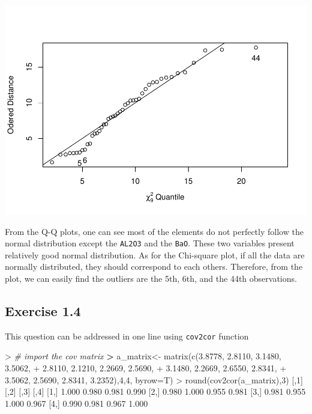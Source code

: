 \documentclass[
]{article}
\newenvironment{Shaded}{\begin{snugshade}}{\end{snugshade}}
\newcommand{\AttributeTok}[1]{\textcolor[rgb]{0.77,0.63,0.00}{#1}}
\newcommand{\CommentTok}[1]{\textcolor[rgb]{0.56,0.35,0.01}{\textit{#1}}}
\newcommand{\DecValTok}[1]{\textcolor[rgb]{0.00,0.00,0.81}{#1}}
\newcommand{\ErrorTok}[1]{\textcolor[rgb]{0.64,0.00,0.00}{\textbf{#1}}}
\newcommand{\FloatTok}[1]{\textcolor[rgb]{0.00,0.00,0.81}{#1}}
\newcommand{\FunctionTok}[1]{\textcolor[rgb]{0.00,0.00,0.00}{#1}}
\newcommand{\NormalTok}[1]{#1}
\newcommand{\OtherTok}[1]{\textcolor[rgb]{0.56,0.35,0.01}{#1}}
\newcommand{\SpecialCharTok}[1]{\textcolor[rgb]{0.00,0.00,0.00}{#1}}
\begin{document}
\includegraphics[width=0.5\linewidth,height=0.5\textheight]{hudm6122_hw_01_ChenguangPan_files/figure-latex/unnamed-chunk-4-1}

From the Q-Q plots, one can see most of the elements do not perfectly
follow the normal distribution except the \texttt{AL2O3} and the
\texttt{BaO}. These two variables present relatively good normal
distribution. As for the Chi-square plot, if all the data are normally
distributed, they should correspond to each others. Therefore, from the
plot, we can easily find the outliers are the 5th, 6th, and the 44th
observations.

\hypertarget{exercise-1.4}{%
\subsection{Exercise 1.4}\label{exercise-1.4}}

This question can be addressed in one line using \texttt{cov2cor}
function

\begin{Shaded}
\begin{Highlighting}[]
\SpecialCharTok{\textgreater{}} \CommentTok{\# import the cov matrix}
\ErrorTok{\textgreater{}}\NormalTok{ a\_matrix}\OtherTok{\textless{}{-}} \FunctionTok{matrix}\NormalTok{(}\FunctionTok{c}\NormalTok{(}\FloatTok{3.8778}\NormalTok{, }\FloatTok{2.8110}\NormalTok{, }\FloatTok{3.1480}\NormalTok{, }\FloatTok{3.5062}\NormalTok{,}
\SpecialCharTok{+}                     \FloatTok{2.8110}\NormalTok{, }\FloatTok{2.1210}\NormalTok{, }\FloatTok{2.2669}\NormalTok{, }\FloatTok{2.5690}\NormalTok{,}
\SpecialCharTok{+}                     \FloatTok{3.1480}\NormalTok{, }\FloatTok{2.2669}\NormalTok{, }\FloatTok{2.6550}\NormalTok{, }\FloatTok{2.8341}\NormalTok{,}
\SpecialCharTok{+}                     \FloatTok{3.5062}\NormalTok{, }\FloatTok{2.5690}\NormalTok{, }\FloatTok{2.8341}\NormalTok{, }\FloatTok{3.2352}\NormalTok{),}\DecValTok{4}\NormalTok{,}\DecValTok{4}\NormalTok{, }\AttributeTok{byrow=}\NormalTok{T)}
\SpecialCharTok{\textgreater{}} \FunctionTok{round}\NormalTok{(}\FunctionTok{cov2cor}\NormalTok{(a\_matrix),}\DecValTok{3}\NormalTok{)}
\NormalTok{      [,}\DecValTok{1}\NormalTok{]  [,}\DecValTok{2}\NormalTok{]  [,}\DecValTok{3}\NormalTok{]  [,}\DecValTok{4}\NormalTok{]}
\NormalTok{[}\DecValTok{1}\NormalTok{,] }\FloatTok{1.000} \FloatTok{0.980} \FloatTok{0.981} \FloatTok{0.990}
\NormalTok{[}\DecValTok{2}\NormalTok{,] }\FloatTok{0.980} \FloatTok{1.000} \FloatTok{0.955} \FloatTok{0.981}
\NormalTok{[}\DecValTok{3}\NormalTok{,] }\FloatTok{0.981} \FloatTok{0.955} \FloatTok{1.000} \FloatTok{0.967}
\NormalTok{[}\DecValTok{4}\NormalTok{,] }\FloatTok{0.990} \FloatTok{0.981} \FloatTok{0.967} \FloatTok{1.000}
\end{Highlighting}
\end{Shaded}
\end{document}
